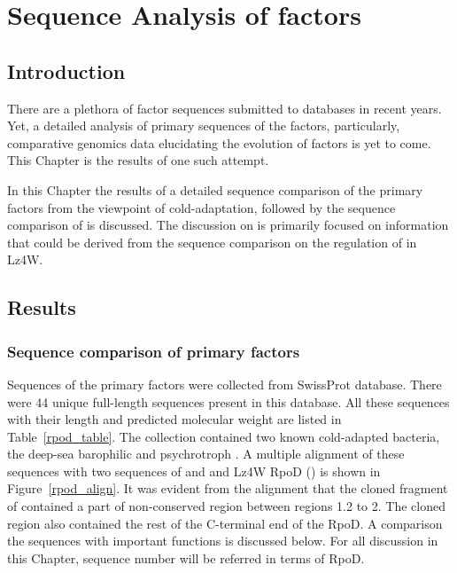\chapter{Sequence Analysis of \s{} factors}

\section{Introduction}

There are a plethora of \s{} factor sequences submitted to
databases in recent years. Yet, a detailed analysis of primary
sequences of the \s{} factors, particularly, comparative genomics
data elucidating the evolution of \s{} factors is yet to come.
This Chapter is the results of one such attempt.

In this Chapter the results of a detailed sequence comparison of
the primary \s{} factors from the viewpoint of cold-adaptation,
followed by the sequence comparison of  is discussed. The
discussion on  is primarily focused on  information that
could be derived from the sequence comparison on the regulation of
 in Lz4W.

\section{Results}

\subsection{Sequence comparison of primary \s{} factors}

Sequences of the primary \s{} factors  were collected from
SwissProt database. There were 44 unique full-length sequences
present in this database. All these sequences with their length
and predicted molecular weight are listed in
Table~\ref{rpod_table}. The collection contained two known
cold-adapted bacteria, the deep-sea barophilic  and psychrotroph . A multiple
alignment of these sequences with two sequences of  and  and Lz4W RpoD (\Lzsiga{})
is shown in Figure~\ref{rpod_align}. It was evident from the
alignment that the cloned fragment of \lzsiga{} contained a part
of non-conserved region between regions 1.2 to 2. The cloned
region also contained the rest of the C-terminal end of the RpoD.
A comparison the sequences with important functions is discussed
below. For all discussion in this Chapter, sequence number will be
referred in terms of  RpoD.

